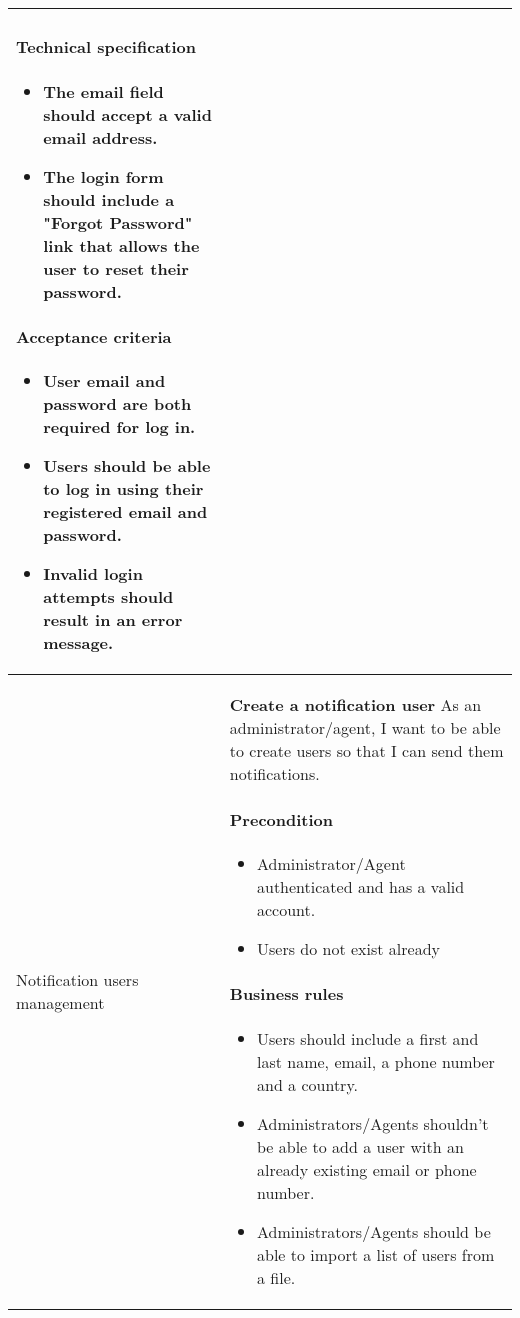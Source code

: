 \begin{longtable}{ | m{} | m{} | }
    \paragraph*{Technical specification} \mbox{} \newline
    \begin{itemize}
        \item The email field should accept a valid email address.
        \item The login form should include a "Forgot Password" link that allows the user to reset their password.

    \end{itemize}
    \paragraph*{Acceptance criteria} \mbox{} \newline
    \begin{itemize}
        \item User email and password are both required for log in.
        \item Users should be able to log in using their registered email and password.
        \item Invalid login attempts should result in an error message.
    \end{itemize}                                                                                                                                                                                        \\
    \hline
    Notification users management                      & \textbf{Create a notification user} \newline As an administrator/agent, I want to be able to create users so that I can send them notifications.
    \paragraph*{Precondition} \mbox{} \newline
    \begin{itemize}
        \item Administrator/Agent authenticated and has a valid account.
        \item Users do not exist already
    \end{itemize}
    \paragraph*{Business rules} \mbox{} \newline
    \begin{itemize}
        \item Users should include a first and last name, email, a phone number and a country.
        \item Administrators/Agents shouldn’t be able to add a user with an already existing email or phone number.
        \item Administrators/Agents should be able to import a list of users from a file.
    \end{itemize}

\end{longtable}
